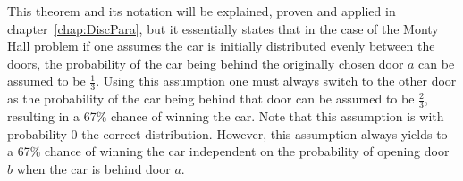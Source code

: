 \documentclass[twoside,a4paper]{report}
\theoremstyle{plain}
\theoremstyle{definition}
\theoremstyle{remark}
\numberwithin{equation}{chapter}
\DeclareMathOperator{\1}{\mathbbm{1}}
\begin{document}
This theorem and its notation will be explained, proven and applied in chapter~\ref{chap:DiscPara}, but it essentially states that in the case of the Monty Hall problem if one assumes the car is initially distributed evenly between the doors, the probability of the car being behind the originally chosen door $a$ can be assumed to be $\frac{1}{3}$. Using this assumption one must always switch to the other door as the probability of the car being behind that door can be assumed to be $\frac{2}{3}$, resulting in a 67\% chance of winning the car. Note that this assumption is with probability 0 the correct distribution. However, this assumption always yields to a 67\% chance of winning the car independent on the probability of opening door $b$ when the car is behind door $a$.


\begin{comment}
A third still unsolved problem is the Sleeping Beauty problem. In this problem Sleeping Beauty is willing to do an experiment. At Sunday she goes to sleep. A fair coin is tossed with the following results: Sleeping Beauty wakes on Monday with heads and wakes on Monday and Tuesday with tails. If she is awake, she must state her credence of the coin giving heads. After the question, she goes to sleep using an amnesia-inducing drug which makes her forget that she has waken before. At Wednesday she wakes and the experiment is over.

A first argument of the probability distribution of the coin is given by the halfers. When Sleeping Beauty wakes, she has no clue what day it is. She knows that the coin is fair and has no reason guess otherwise, thus she must say the the coin is still fair.\\
Another argument is given by the thirders. Namely that there are three possible events, namely awake on Monday and coin has heads, awake on Monday and coin has tails and as last awake on Tuesday and coin has tails. She does not know which event she attends, thus the events happen with uniform probability. There is one event with the coin giving heads, thus the probability of the coin having heads is 33\$.

I propose a solution that the thirders use a different model than the halfers. The question concerns the probability distribution of the coin, which remains 50\%. The thirders answer the question `what is the probability of guessing correctly if I guess that the coin landed heads', which is 33\%. This solution will be discussed with more depth in chapter~\ref{chap:SleepingBeauty}.
\end{comment}
\end{document}
